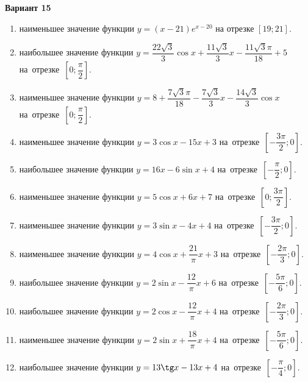 \documentclass[a4paper,10pt]{article}
\begin{document}
\begin{center}\Large\textbf{Вариант 15}\end{center}

\begin{enumerate}
\item {} наименьшее значение функции $y=\left(x-21\right)e^{x-20}$ на отрезке $\left[19;21\right]$.

\item {} наибольшее значение функции $y=\dfrac{22\sqrt{3}}{3}\cos x+\dfrac{11\sqrt{3}}{3}x-\dfrac{11\sqrt{3}\pi }{18}+5$ на~отрезке~$\left[0;\dfrac{\pi }{2}\right]$.

\item {} наименьшее значение функции $y=8+\dfrac{7\sqrt{3}\pi }{18}-\dfrac{7\sqrt{3}}{3}x-\dfrac{14\sqrt{3}}{3}\cos x$ на~отрезке~$\left[0;\dfrac{\pi }{2}\right]$.

\item {} наименьшее значение функции $y=3\cos x-15x+3$ на~отрезке~$\left[-\dfrac{3\pi }{2};0\right]$.

\item {} наибольшее значение функции $y=16x-6\sin x+4$ на~отрезке~$\left[-\dfrac{\pi }{2};0\right]$.

\item {} наименьшее значение функции $y=5\cos x+6x+7$ на~отрезке~$\left[0;\dfrac{3\pi }{2}\right]$.

\item {} наименьшее значение функции $y=3\sin x-4x+4$ на~отрезке~$\left[-\dfrac{3\pi }{2};0\right]$.

\item {} наименьшее значение функции $y=4\cos x+\dfrac{21}{\pi }x+3$ на~отрезке~$\left[-\dfrac{2\pi }{3};0\right]$.

\item {} наибольшее значение функции $y=2\sin x-\dfrac{12}{\pi }x+6$ на~отрезке~$\left[-\dfrac{5\pi }{6};0\right]$.

\item {} наибольшее значение функции $y=2\cos x-\dfrac{12}{\pi }x+4$ на~отрезке~$\left[-\dfrac{2\pi }{3};0\right]$.

\item {} наименьшее значение функции $y=2\sin x+\dfrac{18}{\pi }x+4$ на~отрезке~$\left[-\dfrac{5\pi }{6};0\right]$.

\item {} наибольшее значение функции $y=13\tg x-13x+4$ на~отрезке~$\left[-\dfrac{\pi }{4};0\right]$.


\end{enumerate}
\end{document}

